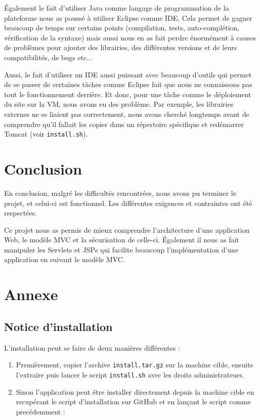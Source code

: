 Également le fait d'utiliser Java comme langage de programmation de la plateforme nous as
poussé à utiliser Eclipse comme IDE. Cela permet de gagner beaucoup de temps sur certains points
(compilation, tests, auto-complétion, vérification de la syntaxe) mais aussi nous en as fait
perdre énormément à causes de problèmes pour ajouter des librairies, des différentes versions
et de leurs compatibilités, de bugs etc...

Aussi, le fait d'utiliser un IDE aussi puissant avec beaucoup d'outils qui permet de se passer de
certaines tâches comme Eclipse fait que nous ne connaissons pas tout le fonctionnement derrière.
Et donc, pour une tâche comme le déploiement du site sur la VM, nous avons eu des problème. Par
exemple, les librairies externes ne se liaient pas correctement, nous avons cherché longtemps
avant de comprendre qu'il fallait les copier dans un répertoire spécifique et redémarrer Tomcat
(voir \verb:install.sh:).


\chapter{Conclusion}
En conclusion, malgré les difficultés rencontrées, nous avons pu terminer le projet, et celui-ci
est fonctionnel. Les différentes exigences et contraintes ont été respectées.

Ce projet nous as permis de mieux comprendre l'architecture d'une application Web, le modèle
MVC et la sécurisation de celle-ci. Également il nous as fait manipuler les Servlets et JSPs
qui facilite beaucoup l'implémentation d'une application en suivant le modèle MVC.

\chapter{Annexe}

\section{Notice d'installation}

L'installation peut se faire de deux manières différentes :

\begin{enumerate}
    \item Premièrement, copier l'archive \verb:install.tar.gz: sur la machine cible, ensuite
        l'extraire puis lancer le script \verb:install.sh: avec les droits administrateurs.

    \item Sinon l'application peut être installer directement depuis la machine cible en recupérant
        le script d'installation sur GitHub et en lançant le script comme precédemment :
\end{enumerate}

